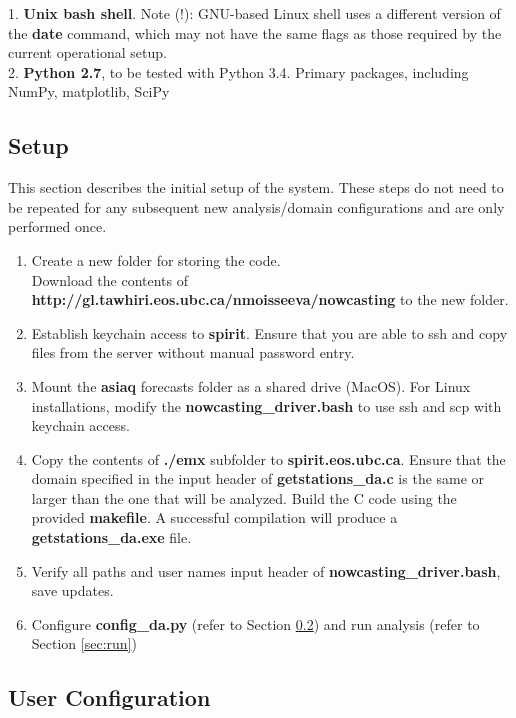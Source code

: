 \documentclass{article}
\begin{document}
1. \textbf{Unix bash shell}. Note (!): GNU-based Linux shell uses a different version of the \textbf{date} command, which may not have the same flags as those required by the current operational setup. \\

2. \textbf{Python 2.7}, to be tested with Python 3.4. Primary packages, including NumPy, matplotlib, SciPy

\subsection{Setup}

This section describes the initial setup of the system. These steps do not need to be repeated for any subsequent new analysis/domain configurations and are only performed once. 
\begin{enumerate}[1.]
\item Create a new folder for storing the code. \\ Download the contents of \textbf{http://gl.tawhiri.eos.ubc.ca/nmoisseeva/nowcasting} to the new folder.
\item Establish keychain access to \textbf{spirit}. Ensure that you are able to ssh and copy files from the server without manual password entry. 
\item Mount the \textbf{asiaq} forecasts folder as a shared drive (MacOS). For Linux installations, modify the \textbf{nowcasting\_driver.bash} to use ssh and scp with keychain access. 
\item Copy the contents of \textbf{./emx} subfolder to \textbf{spirit.eos.ubc.ca}. Ensure that the domain specified in the input header of \textbf{getstations\_da.c} is the same or larger than the one that will be analyzed. Build the C code using the provided \textbf{makefile}. A successful compilation will produce a \textbf{getstations\_da.exe} file. 
\item Verify all paths and user names input header of \textbf{nowcasting\_driver.bash}, save updates. 
\item Configure \textbf{config\_da.py} (refer to Section \ref{sec:config}) and run analysis (refer to Section \ref{sec:run})

\end{enumerate}

\subsection{User Configuration}\label{sec:config}
\end{document}
